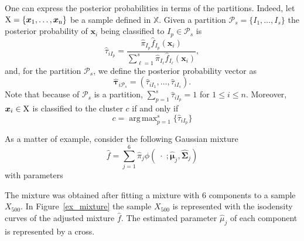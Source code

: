 \documentclass[10pt, a4paper]{article}
\DeclareMathOperator*{\argmax}{arg\,max}
\newcommand{\m}[1]{\boldsymbol{#1}}
\begin{document}
\begin{spacing}{1.9}
One can express the posterior probabilities in terms of the partitions. Indeed, let $\rm X = \{\m x_1,\dots, \m x_n\}$ be a sample defined in $\mathbb{X}$. Given a partition $\mathcal{P}_s = \{ I_1, \dots, I_s \}$ the posterior probability of $\m x_i$ being classified to $I_p\in \mathcal{P}_{s}$ is
\[
\hat{\tau}_{i I_p} =  \frac{ \hat{\pi}_{I_p} \hat{f}_{I_p}(\m x_i) }{\sum_{\ell=1}^s \hat{\pi}_{I_\ell} \hat{f}_{I_\ell}(\m x_i)},
\]
and, for the partition  $\mathcal{P}_s$, we define the posterior probability vector as
\[
\hat{\m\tau}_{i \mathcal{P}_s} = \left( \hat{\tau}_{i I_1} , \dots, \hat{\tau}_{i I_s}  \right).
\]
Note that because of $\mathcal{P}_s$ is a partition, $\sum_{p=1}^s \hat{\tau}_{i I_p} = 1$ for $1 \leq i \leq n$.
Moreover, $\m x_i \in \rm X$ is classified to the cluster $c$ if and only if
\begin{equation}\label{cluster_criteria}
c= \argmax_{p=1}^s \{ \hat{\tau}_{i I_p} \}
\end{equation}


As a matter of example, consider the following Gaussian mixture
\[
\hat{f} = \sum_{j=1}^6 \hat{\pi}_j \phi(\;\cdot\; ; \hat{\m\mu}_j, \hat{\m\Sigma}_j)
\]
with parameters
{\small

}
The mixture was obtained after fitting a mixture with $6$ components to a sample $X_{500}$. In Figure~\ref{ex_mixture} the sample $X_{500}$ is represented with the isodensity curves of the adjusted mixture $\hat{f}$. The estimated parameter $\hat{\mu}_j$ of each component is represented by a cross.




\end{spacing}
\end{document}
